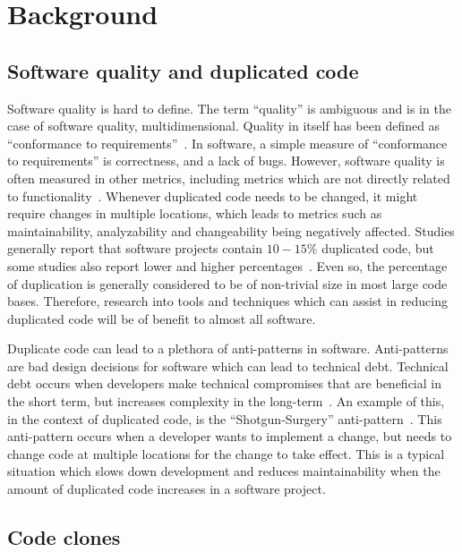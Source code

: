 \chapter{Background}
\label{background}

\section{Software quality and duplicated code}

Software quality is hard to define. The term ``quality'' is ambiguous and is in the case
of software quality, multidimensional. Quality in itself has been defined as ``conformance
to requirements''~\cite[8]{crosby1980quality}. In software, a simple measure of
``conformance to requirements'' is correctness, and a lack of bugs. However, software
quality is often measured in other metrics, including metrics which are not directly
related to functionality~\cite[29]{MetricsAndModelsInSoftwareQuality}. Whenever duplicated
code needs to be changed, it might require changes in multiple locations, which leads to
metrics such as maintainability, analyzability and changeability being negatively
affected. Studies generally report that software projects contain $10-15\%$ duplicated
code, but some studies also report lower and higher percentages~\cite{CloningByAccident}.
Even so, the percentage of duplication is generally considered to be of non-trivial size
in most large code bases. Therefore, research into tools and techniques which can assist
in reducing duplicated code will be of benefit to almost all software.

Duplicate code can lead to a plethora of anti-patterns in software. Anti-patterns are bad
design decisions for software which can lead to technical debt. Technical debt occurs when
developers make technical compromises that are beneficial in the short term, but increases
complexity in the long-term~\cite[111]{TechnicalDebt}. An example of this, in the context
of duplicated code, is the ``Shotgun-Surgery'' anti-pattern~\cite[66]{fowlerrefactoring}.
This anti-pattern occurs when a developer wants to implement a change, but needs to change
code at multiple locations for the change to take effect. This is a typical situation
which slows down development and reduces maintainability when the amount of duplicated
code increases in a software project.

\section{Code clones}

